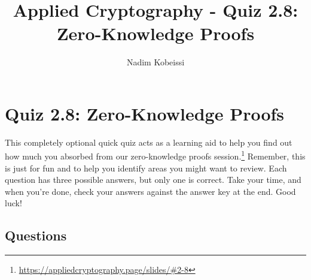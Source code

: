 \documentclass[10pt,a4paper,american]{exam}
\title{Applied Cryptography - Quiz 2.8: Zero-Knowledge Proofs}
\author{Nadim Kobeissi}
\begin{document}
\classhandoutheader
\section*{Quiz 2.8: Zero-Knowledge Proofs}

\begin{tcolorbox}[colframe=OliveGreen!30!white,colback=OliveGreen!5!white]
	This completely optional quick quiz acts as a learning aid to help you find out how much you absorbed from our zero-knowledge proofs session.\footnote{\url{https://appliedcryptography.page/slides/\#2-8}} Remember, this is just for fun and to help you identify areas you might want to review. Each question has three possible answers, but only one is correct. Take your time, and when you're done, check your answers against the answer key at the end. Good luck!
\end{tcolorbox}

\subsection*{Questions}
\end{document}
